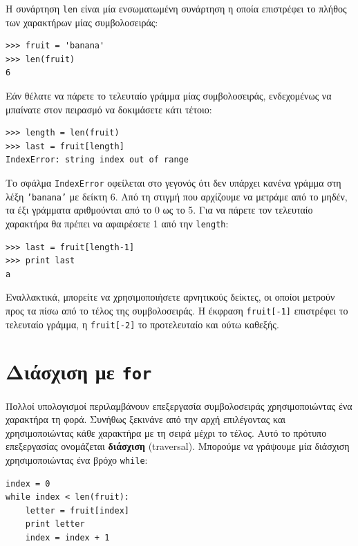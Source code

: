 \documentclass[10pt]{book}
\begin{document}
Η συνάρτηση {\tt len} είναι μία ενσωματωμένη συνάρτηση η οποία επιστρέφει
το πλήθος των χαρακτήρων μίας συμβολοσειράς:

\begin{verbatim}
>>> fruit = 'banana'
>>> len(fruit)
6
\end{verbatim}
%

Εάν θέλατε να πάρετε το τελευταίο γράμμα μίας συμβολοσειράς, ενδεχομένως να μπαίνατε στον πειρασμό να δοκιμάσετε κάτι τέτοιο:

\begin{verbatim}
>>> length = len(fruit)
>>> last = fruit[length]
IndexError: string index out of range
\end{verbatim}
%

Το σφάλμα {\tt IndexError} οφείλεται στο γεγονός ότι δεν υπάρχει κανένα γράμμα
στη λέξη {\tt 'banana'} με δείκτη 6. Από τη στιγμή που αρχίζουμε να μετράμε από το μηδέν, τα έξι γράμματα αριθμούνται από το 0 ως το 5. Για να πάρετε τον τελευταίο χαρακτήρα θα πρέπει να αφαιρέσετε 1 από την {\tt length}:

\begin{verbatim}
>>> last = fruit[length-1]
>>> print last
a
\end{verbatim}
%

Εναλλακτικά, μπορείτε να χρησιμοποιήσετε αρνητικούς δείκτες, οι οποίοι μετρούν προς τα πίσω από το τέλος της συμβολοσειράς. Η έκφραση {\tt fruit[-1]} επιστρέφει το τελευταίο γράμμα, η {\tt fruit[-2]} το προτελευταίο και ούτω καθεξής.


\section{Διάσχιση με {\tt for}}
\label{for}

Πολλοί υπολογισμοί περιλαμβάνουν επεξεργασία συμβολοσειράς χρησιμοποιώντας ένα χαρακτήρα τη φορά. Συνήθως ξεκινάνε από την αρχή επιλέγοντας και χρησιμοποιώντας κάθε χαρακτήρα με τη σειρά μέχρι το τέλος. Αυτό το πρότυπο επεξεργασίας ονομάζεται {\bf διάσχιση} (traversal). Μπορούμε να γράψουμε μία διάσχιση χρησιμοποιώντας ένα βρόχο {\tt while}:

\begin{verbatim}
index = 0
while index < len(fruit):
    letter = fruit[index]
    print letter
    index = index + 1
\end{verbatim}
%
\end{document}
